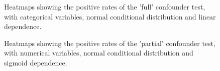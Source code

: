 \begin{figure}[H]
  \centering
  \caption{Heatmaps showing the positive rates of the 'full' confounder test, with categorical variables, normal conditional distribution and linear dependence.}
  \label{fig:sim-bbb-lin-full}
\end{figure}

\begin{figure}[H]
  \centering
  \caption{Heatmaps showing the positive rates of the 'partial' confounder test, with numerical variables, normal conditional distribution and sigmoid dependence.}
  \label{fig:sim-ccc-sig-partial}
\end{figure}

